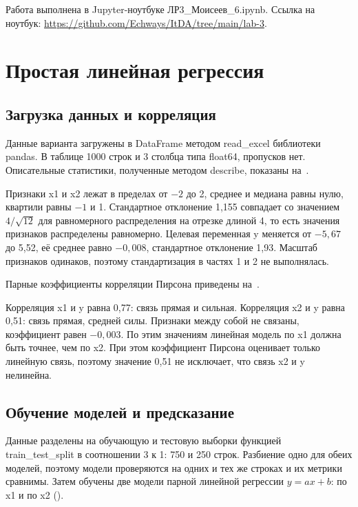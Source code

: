 \documentclass[a4paper,14pt]{extarticle}
\begin{document}
Работа выполнена в Jupyter-ноутбуке ЛР3\_Моисеев\_6.ipynb. Ссылка на ноутбук: \url{https://github.com/Echways/ItDA/tree/main/lab-3}.

\section{Простая линейная регрессия}

\subsection{Загрузка данных и корреляция}

Данные варианта загружены в DataFrame методом read\_excel библиотеки pandas. В таблице 1000 строк и 3 столбца типа float64, пропусков нет. Описательные статистики, полученные методом describe, показаны на~.


Признаки x1 и x2 лежат в пределах от $-2$ до 2, среднее и медиана равны нулю, квартили равны $-1$ и 1. Стандартное отклонение 1,155 совпадает со значением $4 / \sqrt{12}$ для равномерного распределения на отрезке длиной 4, то есть значения признаков распределены равномерно. Целевая переменная y меняется от $-5{,}67$ до 5,52, её среднее равно $-0{,}008$, стандартное отклонение 1,93. Масштаб признаков одинаков, поэтому стандартизация в частях 1 и 2 не выполнялась.

Парные коэффициенты корреляции Пирсона приведены на~.


Корреляция x1 и y равна 0,77: связь прямая и сильная. Корреляция x2 и y равна 0,51: связь прямая, средней силы. Признаки между собой не связаны, коэффициент равен $-0{,}003$. По этим значениям линейная модель по x1 должна быть точнее, чем по x2. При этом коэффициент Пирсона оценивает только линейную связь, поэтому значение 0,51 не исключает, что связь x2 и y нелинейна.

\subsection{Обучение моделей и предсказание}

Данные разделены на обучающую и тестовую выборки функцией train\_test\_split в соотношении 3 к 1: 750 и 250 строк. Разбиение одно для обеих моделей, поэтому модели проверяются на одних и тех же строках и их метрики сравнимы. Затем обучены две модели парной линейной регрессии $y = ax + b$: по x1 и по x2 ().
\end{document}
